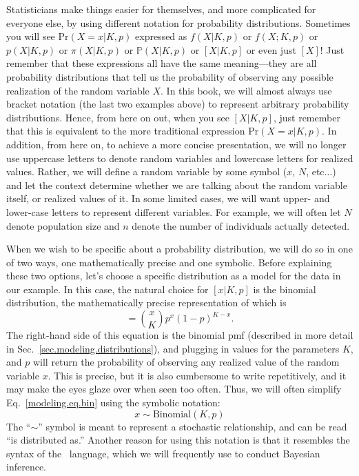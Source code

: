 Statisticians make things easier for themselves,
and more complicated for everyone else, by using different notation
for probability distributions. Sometimes you will see
$\text{Pr}(X=x|K,p)$ expressed as $f(X|K,p)$ or $f(X; K,p)$ or
$p(X|K,p)$ or $\pi(X|K,p)$ or $\mathbb{P}(X|K,p)$ or $[X|K,p]$ or even
just $[X]$! Just remember that these expressions all have the same
meaning---they are all probability distributions that tell us the
probability of observing any possible realization of the random
variable $X$. In this book, we will almost always use bracket notation
(the last two examples above) to represent arbitrary probability distributions.
Hence, from here on out, when you see $[X|K,p]$, just remember that
this is equivalent to the more traditional expression $\text{Pr}(X=x|K,p)$.
In addition, from here on, to achieve a more concise presentation, we
will no longer use uppercase letters to denote
random variables and lowercase letters for realized values. Rather, we
will define a random variable by some symbol ($x$, $N$, etc$\dots$)
and let the context determine whether we are talking about the
random variable itself, or realized values of it.
In some limited cases, we will want upper-
and lower-case letters to represent different variables. For example,
we will often let $N$ denote population size and $n$ denote the number
of individuals actually detected.

When we wish to be specific about a probability distribution, we will do
so in one of two ways, one mathematically precise and one symbolic. Before explaining
these two options, let's choose a specific distribution as a model for
the data in our example. In this case, the natural choice for
$[x|K,p]$ is the binomial distribution, the mathematically precise representation of
which is
\begin{equation}
  [x|K,p] =              \binom{x}{K}p^x(1-p)^{K-x}.
  \label{modeling.eq.bin}
\end{equation}
The right-hand side of this equation is the binomial pmf (described in
more detail in Sec.~\ref{sec.modeling.distributions}), and plugging in
values for the parameters $K$, and $p$ will return the probability of
observing any realized value of the random variable $x$. This is precise, but it is also
cumbersome to write repetitively, and it may make the eyes glaze over
when seen too often. Thus, we will
often simplify Eq.~\ref{modeling.eq.bin} using the symbolic notation:
\begin{equation}
  x \sim \text{Binomial}(K, p)
  \label{modeling.eq.binsym}
\end{equation}
The ``$\sim$'' symbol is meant to represent a stochastic relationship, and
can be read ``is distributed as.''
Another reason for using this notation is that
it resembles the syntax of the \bugs~language, which we will
frequently use to conduct Bayesian inference.

